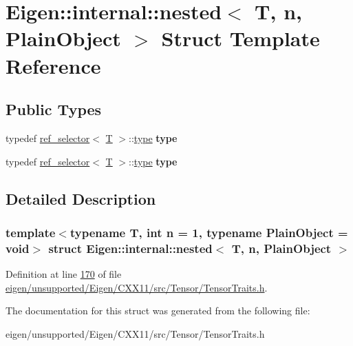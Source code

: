 \hypertarget{struct_eigen_1_1internal_1_1nested}{}\section{Eigen\+:\+:internal\+:\+:nested$<$ T, n, Plain\+Object $>$ Struct Template Reference}
\label{struct_eigen_1_1internal_1_1nested}
\subsection*{Public Types}
\begin{DoxyCompactItemize}
\item 
\mbox{\label{struct_eigen_1_1internal_1_1nested_a4055706399adb16364e143ba5610a673}} 
typedef \hyperlink{struct_eigen_1_1internal_1_1ref__selector}{ref\+\_\+selector}$<$ \hyperlink{group___sparse_core___module}{T} $>$\+::\hyperlink{class_eigen_1_1internal_1_1_tensor_lazy_evaluator_writable}{type} {\bfseries type}
\item 
\mbox{\label{struct_eigen_1_1internal_1_1nested_a4055706399adb16364e143ba5610a673}} 
typedef \hyperlink{struct_eigen_1_1internal_1_1ref__selector}{ref\+\_\+selector}$<$ \hyperlink{group___sparse_core___module}{T} $>$\+::\hyperlink{class_eigen_1_1internal_1_1_tensor_lazy_evaluator_writable}{type} {\bfseries type}
\end{DoxyCompactItemize}


\subsection{Detailed Description}
\subsubsection*{template$<$typename T, int n = 1, typename Plain\+Object = void$>$\newline
struct Eigen\+::internal\+::nested$<$ T, n, Plain\+Object $>$}



Definition at line \hyperlink{eigen_2unsupported_2_eigen_2_c_x_x11_2src_2_tensor_2_tensor_traits_8h_source_l00170}{170} of file \hyperlink{eigen_2unsupported_2_eigen_2_c_x_x11_2src_2_tensor_2_tensor_traits_8h_source}{eigen/unsupported/\+Eigen/\+C\+X\+X11/src/\+Tensor/\+Tensor\+Traits.\+h}.



The documentation for this struct was generated from the following file\+:\begin{DoxyCompactItemize}
\item 
eigen/unsupported/\+Eigen/\+C\+X\+X11/src/\+Tensor/\+Tensor\+Traits.\+h\end{DoxyCompactItemize}
